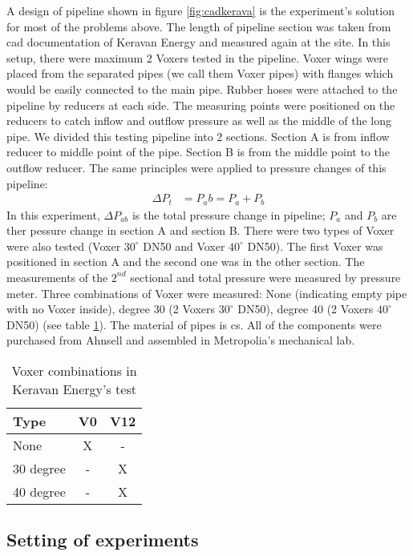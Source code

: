 A design of pipeline shown in figure \vref{fig:cadkerava} is the experiment's solution for most of the problems above. The length of pipeline section was taken from \gls{cad} documentation of Keravan Energy and measured again at the site. In this setup, there were maximum 2 Voxers tested in the pipeline. Voxer wings were placed from the separated pipes (we call them Voxer pipes) with flanges which would be easily connected to the main pipe. 
Rubber hoses were attached to the pipeline by reducers at each side. The measuring points were positioned on the reducers to catch inflow and outflow pressure as well as the middle of the long pipe. We divided this testing pipeline into 2 sections. Section A is from inflow reducer to middle point of the pipe. Section B is from the middle point to the outflow reducer. The same principles were applied to pressure changes of this pipeline: 
\begin{align}
\Delta P_t&= P_ab = P_a + P_b
\end{align}
In this experiment, $\Delta P_{ab}$ is the total pressure change in pipeline; $P_a$ and $P_b$ are  ther pessure change in section A and section B.
There were two types of Voxer were also tested (Voxer $30^{\circ}$ DN50 and Voxer $40^{\circ}$ DN50). The first Voxer was positioned in section A and the second one was in the other section. The measurements of the $2^{nd}$ sectional and total pressure were measured by pressure meter. Three combinations of Voxer were measured: None (indicating empty pipe with no Voxer inside), degree 30 (2 Voxers $30^{\circ}$ DN50), degree 40 (2 Voxers $40^{\circ}$ DN50) (see table \ref{table:kerava}). The material of pipes is \gls{cs}. All of the components were purchased from Ahnsell and assembled in Metropolia's mechanical lab.

\begin{table}[h]
  \centering
  \caption{Voxer combinations in Keravan Energy's test}
  \begin{tabular}{l*{2}{c}}
Type             & V0 & V12 \\
\hline
None & X & -   \\
30 degree           & - & X   \\
40 degree          & - & X   \\
\end{tabular}
  \label{table:kerava}
\end{table}

\subsection{Setting of experiments}

